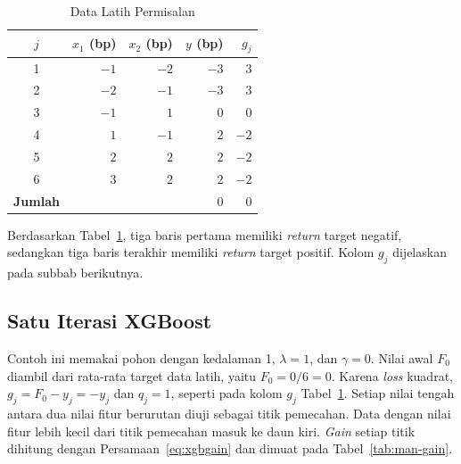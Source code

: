 \begin{table}[htbp]
  \caption{Data Latih Permisalan}
  \label{tab:man-latih}
  \centering
  \begingroup
  \footnotesize
  \setlength{\tabcolsep}{6pt}
  \begin{tabular}{|c|r|r|r|r|}
    \hline
    \textbf{$j$} & \textbf{$x_1$ (bp)} & \textbf{$x_2$ (bp)} & \textbf{$y$ (bp)} & \textbf{$g_j$} \\
    \hline
    1 & $-1$ & $-2$ & $-3$ & $3$ \\
    2 & $-2$ & $-1$ & $-3$ & $3$ \\
    3 & $-1$ & $1$ & $0$ & $0$ \\
    4 & $1$ & $-1$ & $2$ & $-2$ \\
    5 & $2$ & $2$ & $2$ & $-2$ \\
    6 & $3$ & $2$ & $2$ & $-2$ \\
    \textbf{Jumlah} &  &  & $0$ & $0$ \\
    \hline
  \end{tabular}
  \endgroup
\end{table}

Berdasarkan Tabel~\ref{tab:man-latih}, tiga baris pertama memiliki
\textit{return} target negatif, sedangkan tiga baris terakhir memiliki
\textit{return} target positif. Kolom $g_j$ dijelaskan pada subbab berikutnya.

\subsection{Satu Iterasi XGBoost}
Contoh ini memakai pohon dengan kedalaman 1, $\lambda = 1$, dan $\gamma = 0$. Nilai awal $F_0$ diambil dari
rata-rata target data latih, yaitu $F_0 = 0/6 = 0$. Karena \textit{loss}
kuadrat, $g_j = F_0 - y_j = -y_j$ dan $q_j = 1$, seperti pada kolom $g_j$
Tabel~\ref{tab:man-latih}. Setiap nilai tengah antara dua nilai fitur
berurutan diuji sebagai titik pemecahan. Data dengan nilai fitur lebih kecil
dari titik pemecahan masuk ke daun kiri. \textit{Gain} setiap titik dihitung
dengan Persamaan~\eqref{eq:xgbgain} dan dimuat pada Tabel~\ref{tab:man-gain}.

